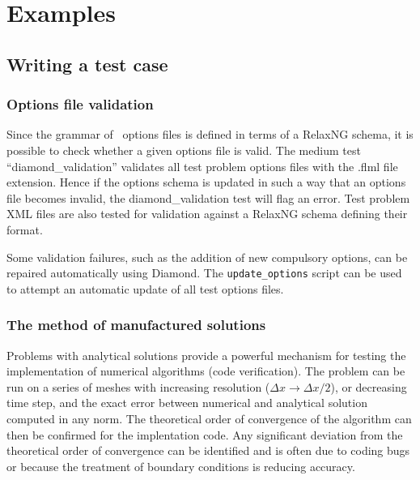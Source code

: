 \chapter{Examples}
\label{chap:examples}


\section{Writing a test case} 

\subsection{Options file validation}

Since the grammar of \fluidity\ options files is defined in terms of a RelaxNG
schema, it is possible to check whether a given options file is valid. The
medium test ``diamond\_validation'' validates all test problem options files
with the .flml file extension. Hence if the options schema is updated in such
a way that an options file becomes invalid, the diamond\_validation test will
flag an error. Test problem XML files are also tested for validation against a
RelaxNG schema defining their format.

Some validation failures, such as the addition of new compulsory options, can
be repaired automatically using Diamond. The \lstinline[language = Bash]+update_options+
script can be used to attempt an automatic update of all test options files.

\subsection{The method of manufactured solutions}\label{sect:mms}
Problems with analytical solutions provide a powerful mechanism for testing the implementation
of numerical algorithms (code verification). The problem can be run on a series of meshes
with increasing resolution (\eg $\Delta x \rightarrow \Delta x/2$), or decreasing time step,
and the exact error between numerical and analytical solution computed in any norm. The theoretical
order of convergence of the algorithm can then be confirmed for the implentation code. Any significant
deviation from the theoretical order of convergence can be identified and is often due to coding bugs
or because the treatment of boundary conditions is reducing accuracy.

